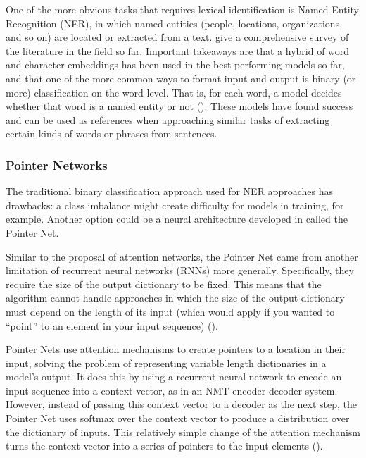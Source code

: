 One of the more obvious tasks that requires lexical identification is Named Entity Recognition (NER), in which named entities (people, locations, organizations, and so on) are located or extracted from a text. \cite{li2018ner} give a comprehensive survey of the literature in the field so far. Important takeaways are that a hybrid of word and character embeddings has been used in the best-performing models so far, and that one of the more common ways to format input and output is binary (or more) classification on the word level. That is, for each word, a model decides whether that word is a named entity or not (\cite{li2018ner}). These models have found success and can be used as references when approaching similar tasks of extracting certain kinds of words or phrases from sentences.

\subsubsection{Pointer Networks} \label{pointer}

The traditional binary classification approach used for NER approaches has drawbacks: a class imbalance might create difficulty for models in training, for example. Another option could be a neural architecture developed in \cite{vinyals2015pointer} called the Pointer Net.

Similar to the proposal of attention networks, the Pointer Net came from another limitation of recurrent neural networks (RNNs) more generally. Specifically, they require the size of the output dictionary to be fixed. This means that the algorithm cannot handle approaches in which the size of the output dictionary must depend on the length of its input (which would apply if you wanted to ``point'' to an element in your input sequence) (\cite{vinyals2015pointer}).

Pointer Nets use attention mechanisms to create pointers to a location in their input, solving the problem of representing variable length dictionaries in a model's output. It does this by using a recurrent neural network to encode an input sequence into a context vector, as in an NMT encoder-decoder system. However, instead of passing this context vector to a decoder as the next step, the Pointer Net uses softmax over the context vector to produce a distribution over the dictionary of inputs. This relatively simple change of the attention mechanism turns the context vector into a series of pointers to the input elements (\cite{vinyals2015pointer}).

